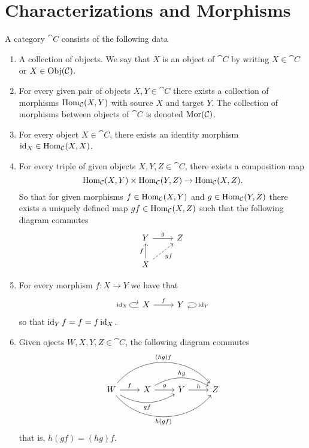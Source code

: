 \section{Characterizations and Morphisms}

\begin{definition}[Category]\label{def: category}
  A category \(\cat C\) consists of the following data
  \begin{enumerate}[(C1)]
    \item A collection of objects. We say that \(X\) is an object of \(\cat C\)
      by writing \(X \in \cat C\) or \(X \in \operatorname{Obj}(\mathcal C)\).
    \item For every given pair of objects \(X, Y \in \cat C\) there exists a
      collection of morphisms \(\operatorname{Hom}_{\mathcal C}(X, Y)\) with source \(X\) and
      target \(Y\). The collection of morphisms between objects of \(\cat C\) is
      denoted \(\operatorname{Mor}(\mathcal C)\).
    \item For every object \(X \in \cat C\), there exists an identity morphism
      \(\operatorname{id}_X \in \operatorname{Hom}_{\mathcal C}(X, X)\).
    \item For every triple of given objects \(X, Y, Z \in \cat C\), there exists
      a composition map
      \[
        \operatorname{Hom}_{\mathcal C}(X, Y) \times \operatorname{Hom}_{\mathcal C}(Y, Z) \to \operatorname{Hom}_{\mathcal C}(X, Z).
      \]
      So that for given morphisms \(f \in \operatorname{Hom}_{\mathcal C}(X, Y)\) and \(g \in
      \operatorname{Hom}_{\mathcal C}(Y, Z)\) there exists a uniquely defined map \(g  f \in
      \operatorname{Hom}_{\mathcal C}(X, Z)\) such that the following diagram commutes
      \[
        \begin{tikzcd}
          Y \ar[r, "g"]
            &Z \\
          X \ar[u, "f"] \ar[ru, dashed, swap, "g  f"]
        \end{tikzcd}
      \]
    \item For every morphism \(f: X \to Y\) we have that
      \[
        \begin{tikzcd}
          X \ar[r, "f"] \ar[loop left, "\Id_X"] &Y \ar[loop right, "\Id_Y"]
        \end{tikzcd}
      \]
      so that \(\operatorname{id}_Y  f = f = f  \operatorname{id}_X\).
    \item Given ojects \(W, X, Y, Z \in \cat C\), the following diagram commutes
      \[
        \begin{tikzcd}
          W
          \ar[r, "f"]
          \ar[rr, bend right, swap, "g  f"]
          \ar[rrr, bend right = 50, swap, "h  (g  f)"]
          \ar[rrr, bend left = 50, "(h  g)  f"]
            &X
            \ar[r, "g"] \ar[rr, bend left, "h  g"]
              &Y
              \ar[r, "h"]
                &Z
        \end{tikzcd}
      \]
      that is, \(h  (g  f) = (h  g)  f\).
  \end{enumerate}
\end{definition}

